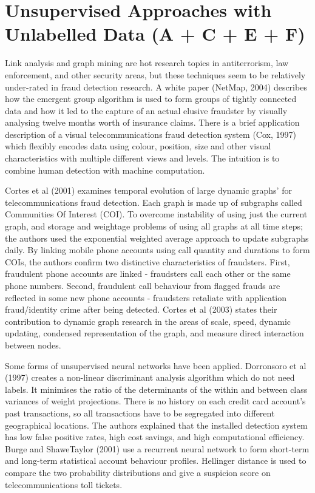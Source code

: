 \section{Unsupervised Approaches with
Unlabelled Data (A + C + E + F)} Link analysis and graph mining are hot
research topics in antiterrorism, law enforcement, and other security areas,
but these techniques seem to be relatively under-rated in fraud detection
research. A white paper (NetMap, 2004) describes how the emergent group
algorithm is used to form groups of tightly connected data and how it led to
the capture of an actual elusive fraudster by visually analysing twelve
months worth of insurance claims. There is a brief application description of
a visual telecommunications fraud detection system (Cox, 1997) which flexibly
encodes data using colour, position, size and other visual characteristics
with multiple different views and levels. The intuition is to combine human
detection with machine computation.
\par
Cortes et al (2001) examines temporal evolution of large dynamic graphs’ for
telecommunications fraud detection. Each graph is made up of subgraphs called
Communities Of Interest (COI). To overcome instability of using just the
current graph, and storage and weightage problems of using all graphs at all
time steps; the authors used the exponential weighted average approach to
update subgraphs daily. By linking mobile phone accounts using call quantity
and durations to form COIs, the authors confirm two distinctive
characteristics of fraudsters. First, fraudulent phone accounts are linked -
fraudsters call each other or the same phone numbers. Second, fraudulent call
behaviour from flagged frauds are reflected in some new phone accounts -
fraudsters retaliate with application fraud/identity crime after being
detected. Cortes et al (2003) states their contribution to dynamic graph
research in the areas of scale, speed, dynamic updating, condensed
representation of the graph, and measure direct interaction between nodes.

\par
Some forms of unsupervised neural networks have been applied. Dorronsoro et
al (1997) creates a non-linear discriminant analysis algorithm which do not
need labels. It minimises the ratio of the determinants of the within and
between class variances of weight projections. There is no history on each
credit card account’s past transactions, so all transactions have to be
segregated into different geographical locations. The authors explained that
the installed detection system has low false positive rates, high cost
savings, and high computational efficiency. Burge and ShaweTaylor (2001) use
a recurrent neural network to form short-term and long-term statistical
account behaviour profiles. Hellinger distance is used to compare the two
probability distributions and give a suspicion score on telecommunications
toll tickets.

